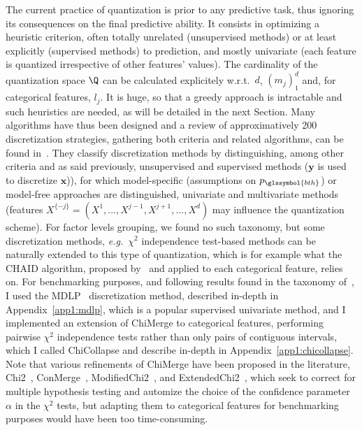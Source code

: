 The current practice of quantization is prior to any predictive task, thus ignoring its consequences on the final predictive ability. It consists in optimizing a heuristic criterion, often totally unrelated (unsupervised methods) or at least explicitly (supervised methods) to prediction, and mostly univariate (each feature is quantized irrespective of other features' values). The cardinality of the quantization space $\Q$ can be calculated explicitely w.r.t.\ $d$, $(m_j)_1^d$ and, for categorical features, $l_j$. It is huge, so that a greedy approach is intractable and such heuristics are needed, as will be detailed in the next Section.
Many algorithms have thus been designed and a review of approximatively 200 discretization strategies, gathering both criteria and related algorithms, can be found in~\cite{ramirez2016data}. They classify discretization methods by distinguishing, among other criteria and as said previously, unsupervised and supervised methods ($\bm{y}$ is used to discretize $\bm{x}$)), for which model-specific (assumptions on $p_{\glssymbol{bth}}$) or model-free approaches are distinguished, univariate and multivariate methods (features $X^{\{-j\}} = (X^{1},\ldots,X^{j-1},X^{j+1},\ldots,X^{d})$ may influence the quantization scheme). For factor levels grouping, we found no such taxonomy, but some discretization methods, \textit{e.g.}\ $\chi^2$ independence test-based methods can be naturally extended to this type of quantization, which is for example what the CHAID algorithm, proposed by~\cite{kass1980exploratory} and applied to each categorical feature, relies on.
For benchmarking purposes, and following results found in the taxonomy of~\cite{ramirez2016data}, I used the MDLP~\cite{fayyad1993multi} discretization method, described in-depth in Appendix~\ref{app1:mdlp}, which is a popular supervised univariate method, and I implemented an extension of ChiMerge to categorical features, performing pairwise $\chi^2$ independence tests rather than only pairs of contiguous intervals, which I called ChiCollapse and describe in-depth in Appendix~\ref{app1:chicollapse}. Note that various refinements of ChiMerge have been proposed in the literature, Chi2~\cite{liu1995chi2}, ConMerge~\cite{wang1998concurrent}, ModifiedChi2~\cite{tay2002modified}, and ExtendedChi2~\cite{su2005extended}, which seek to correct for multiple hypothesis testing and automize the choice of the confidence parameter $\alpha$ in the $\chi^2$ tests, but adapting them to categorical features for benchmarking purposes would have been too time-consuming.



